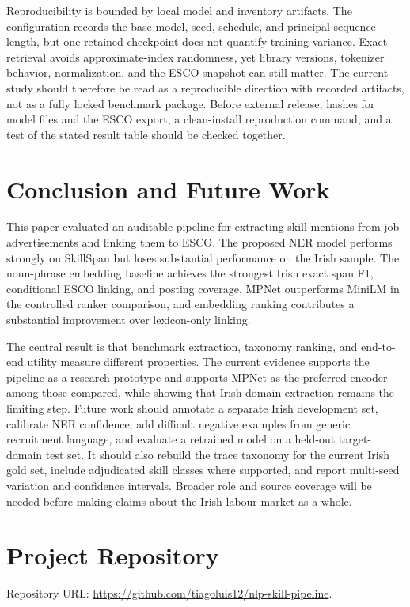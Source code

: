 \documentclass[conference]{IEEEtran}
\begin{document}
Reproducibility is bounded by local model and inventory artifacts. The configuration records the base model, seed, schedule, and principal sequence length, but one retained checkpoint does not quantify training variance. Exact retrieval avoids approximate-index randomness, yet library versions, tokenizer behavior, normalization, and the ESCO snapshot can still matter. The current study should therefore be read as a reproducible direction with recorded artifacts, not as a fully locked benchmark package. Before external release, hashes for model files and the ESCO export, a clean-install reproduction command, and a test of the stated result table should be checked together.

\section{Conclusion and Future Work}
This paper evaluated an auditable pipeline for extracting skill mentions from job advertisements and linking them to ESCO. The proposed NER model performs strongly on SkillSpan but loses substantial performance on the Irish sample. The noun-phrase embedding baseline achieves the strongest Irish exact span F1, conditional ESCO linking, and posting coverage. MPNet outperforms MiniLM in the controlled ranker comparison, and embedding ranking contributes a substantial improvement over lexicon-only linking.

The central result is that benchmark extraction, taxonomy ranking, and end-to-end utility measure different properties. The current evidence supports the pipeline as a research prototype and supports MPNet as the preferred encoder among those compared, while showing that Irish-domain extraction remains the limiting step. Future work should annotate a separate Irish development set, calibrate NER confidence, add difficult negative examples from generic recruitment language, and evaluate a retrained model on a held-out target-domain test set. It should also rebuild the trace taxonomy for the current Irish gold set, include adjudicated skill classes where supported, and report multi-seed variation and confidence intervals. Broader role and source coverage will be needed before making claims about the Irish labour market as a whole.

\appendices
\section{Project Repository}
Repository URL: \url{https://github.com/tiagoluis12/nlp-skill-pipeline}.
\end{document}
